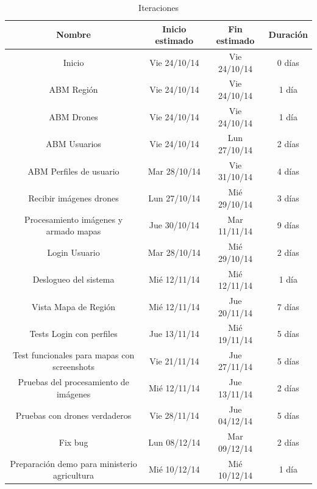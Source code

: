 \begin{landscape}
\begin{table}[ht]
\caption{Iteraciones}
\centering 
\begin{tabular}{c c c c}
\hline
Nombre                                                      & Inicio estimado & Fin estimado & Duración \\
\hline
Inicio                                                      & Vie 24/10/14    & Vie 24/10/14 & 0 días   \\
ABM Región                                                  & Vie 24/10/14    & Vie 24/10/14 & 1 día    \\
ABM Drones                                                  & Vie 24/10/14    & Vie 24/10/14 & 1 día    \\
ABM Usuarios                                                & Vie 24/10/14    & Lun 27/10/14 & 2 días   \\
ABM Perfiles de usuario                                     & Mar 28/10/14    & Vie 31/10/14 & 4 días   \\
Recibir imágenes drones                                     & Lun 27/10/14    & Mié 29/10/14 & 3 días   \\
Procesamiento imágenes y armado mapas                       & Jue 30/10/14    & Mar 11/11/14 & 9 días   \\
Login Usuario                                               & Mar 28/10/14    & Mié 29/10/14 & 2 días   \\
Deslogueo del sistema                                       & Mié 12/11/14    & Mié 12/11/14 & 1 día    \\
Vista Mapa de Región                                        & Mié 12/11/14    & Jue 20/11/14 & 7 días   \\
Tests Login con perfiles                                    & Jue 13/11/14    & Mié 19/11/14 & 5 días   \\
Test funcionales para mapas con screenshots                 & Vie 21/11/14    & Jue 27/11/14 & 5 días   \\
Pruebas del procesamiento de imágenes                       & Mié 12/11/14    & Jue 13/11/14 & 2 días   \\
Pruebas con drones verdaderos                               & Vie 28/11/14    & Jue 04/12/14 & 5 días   \\
Fix bug                                                     & Lun 08/12/14    & Mar 09/12/14 & 2 días   \\
Preparación demo para ministerio agricultura                & Mié 10/12/14    & Mié 10/12/14 & 1 día    \\

\end{tabular}
\end{table}
\end{landscape}
